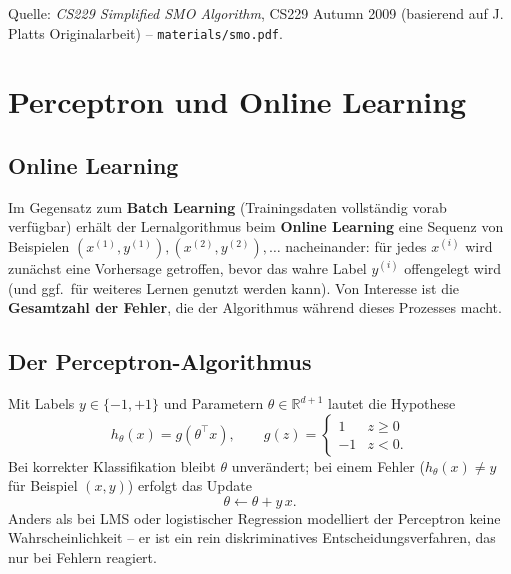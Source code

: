 \documentclass[11pt]{article}
\theoremstyle{csthm}
\theoremstyle{csdef}
\newcommand{\R}{\mathbb{R}}
\newcommand{\htheta}{h_\theta}
\newcommand{\T}{^\top}
\begin{document}
\begin{tcolorbox}[srcstyle]
Quelle: \emph{CS229 Simplified SMO Algorithm}, CS229 Autumn 2009 (basierend
auf J. Platts Originalarbeit) -- \texttt{materials/smo.pdf}.
\end{tcolorbox}

\section{Perceptron und Online Learning}

\subsection{Online Learning}

Im Gegensatz zum \textbf{Batch Learning} (Trainingsdaten vollständig vorab
verfügbar) erhält der Lernalgorithmus beim \textbf{Online Learning} eine
Sequenz von Beispielen $(x^{(1)},y^{(1)}), (x^{(2)},y^{(2)}),\ldots$
nacheinander: für jedes $x^{(i)}$ wird zunächst eine Vorhersage getroffen,
bevor das wahre Label $y^{(i)}$ offengelegt wird (und ggf.\ für weiteres
Lernen genutzt werden kann). Von Interesse ist die \textbf{Gesamtzahl der
Fehler}, die der Algorithmus während dieses Prozesses macht.

\subsection{Der Perceptron-Algorithmus}

Mit Labels $y \in \{-1,+1\}$ und Parametern $\theta \in \R^{d+1}$ lautet die
Hypothese
\begin{equation}
  \htheta(x) = g(\theta\T x), \qquad
  g(z) = \begin{cases} 1 & z \geq 0 \\ -1 & z < 0. \end{cases}
\end{equation}
Bei korrekter Klassifikation bleibt $\theta$ unverändert; bei einem Fehler
($\htheta(x)\neq y$ für Beispiel $(x,y)$) erfolgt das Update
\begin{equation}
  \theta \leftarrow \theta + y\, x.
\end{equation}
Anders als bei LMS oder logistischer Regression modelliert der Perceptron
keine Wahrscheinlichkeit -- er ist ein rein diskriminatives
Entscheidungsverfahren, das nur bei Fehlern reagiert.
\end{document}
